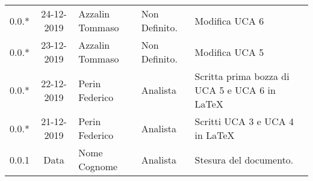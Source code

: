 {\begin{longtable}{ c c  C{4cm}  C{3cm} C{4cm}}
0.0.* & 24-12-2019 & Azzalin Tommaso & Non Definito. & Modifica UCA 6\\

0.0.* & 23-12-2019 & Azzalin Tommaso & Non Definito. & Modifica UCA 5\\

0.0.* & 22-12-2019 & Perin Federico & Analista & Scritta prima bozza di UCA 5 e UCA 6 in LaTeX\\

0.0.* & 21-12-2019 & Perin Federico & Analista & Scritti UCA 3 e UCA 4 in LaTeX\\

0.0.1 & Data & Nome Cognome & Analista & Stesura del documento.  \\		
		
\end{longtable}
}